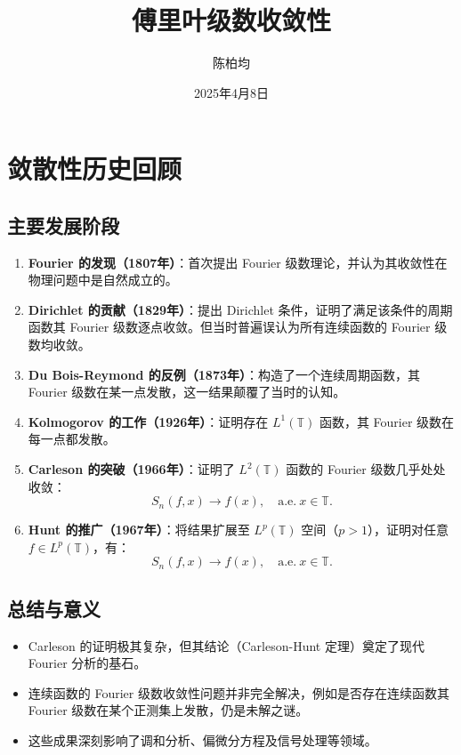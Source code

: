 \documentclass[12pt]{article}
\title{傅里叶级数收敛性}
\author{陈柏均}
\date{2025年4月8日}
\begin{document}
	
	\maketitle
	
	\newpage
	
	\tableofcontents  %
	
	
	\newpage
	
	
	
	\section{敛散性历史回顾}
	
	\subsection{主要发展阶段}
	\begin{enumerate}[leftmargin=2cm]
		\item \textbf{Fourier 的发现（1807年）}：首次提出 Fourier 级数理论，并认为其收敛性在物理问题中是自然成立的。
		
		\item \textbf{Dirichlet 的贡献（1829年）}：提出 Dirichlet 条件，证明了满足该条件的周期函数其 Fourier 级数逐点收敛。但当时普遍误认为所有连续函数的 Fourier 级数均收敛。
		
		\item \textbf{Du Bois-Reymond 的反例（1873年）}：构造了一个连续周期函数，其 Fourier 级数在某一点发散，这一结果颠覆了当时的认知。
		
		\item \textbf{Kolmogorov 的工作（1926年）}：证明存在 $L^1(\mathbb{T})$ 函数，其 Fourier 级数在每一点都发散。
		
		\item \textbf{Carleson 的突破（1966年）}：证明了 $L^2(\mathbb{T})$ 函数的 Fourier 级数几乎处处收敛：
		\[
		S_n(f,x) \rightarrow f(x), \quad \text{a.e.} \ x \in \mathbb{T}.
		\]
		
		\item \textbf{Hunt 的推广（1967年）}：将结果扩展至 $L^p(\mathbb{T})$ 空间（$p>1$），证明对任意 $f \in L^p(\mathbb{T})$，有：
		\[
		S_n(f,x) \rightarrow f(x), \quad \text{a.e.} \ x \in \mathbb{T}.
		\]
	\end{enumerate}
	
	\subsection{总结与意义}
	\begin{itemize}
		\item Carleson 的证明极其复杂，但其结论（Carleson-Hunt 定理）奠定了现代 Fourier 分析的基石。
		\item 连续函数的 Fourier 级数收敛性问题并非完全解决，例如是否存在连续函数其 Fourier 级数在某个正测集上发散，仍是未解之谜。
		\item 这些成果深刻影响了调和分析、偏微分方程及信号处理等领域。
	\end{itemize}
	
\end{document}
